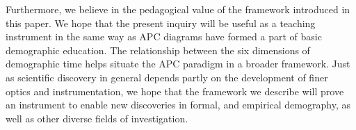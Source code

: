 \documentclass[12pt,oneside,a4paper]{article} %
\theoremstyle{definition}
\newcommand\vt[1]{\textcolor{rd}{#1}}
\begin{document}
Furthermore, we believe in the pedagogical value of the framework
introduced in this paper. We hope that the
present inquiry will be useful as a teaching instrument in the same way as APC
diagrams have formed a part of basic demographic education.
The relationship between the six dimensions of demographic time helps situate the APC
paradigm in a broader framework. Just as scientific discovery in general
depends partly on the development of finer optics and instrumentation, we hope
that the framework we describe will prove an instrument to enable new
discoveries in formal, and empirical demography, as well as other diverse fields of
investigation.



\end{document}
